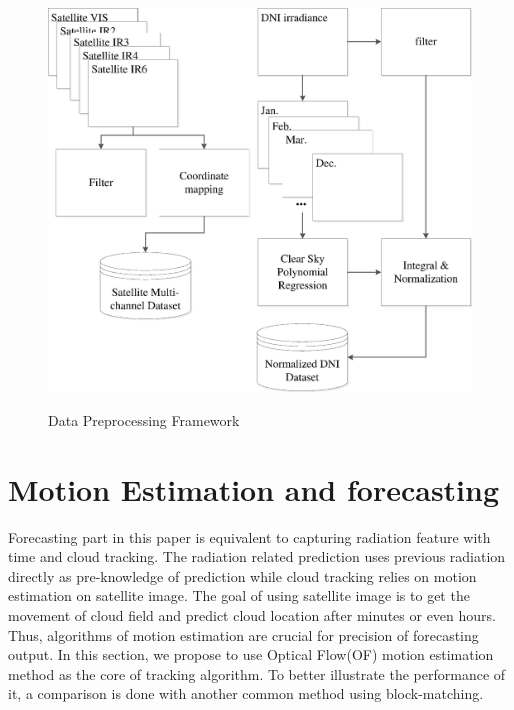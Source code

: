 \documentclass[conference]{IEEEtran}
\begin{document}
\begin{figure}[tb]
\centering
\includegraphics[width=3 in]{satprepro}
\label{fig:satpre}
\caption{Data Preprocessing Framework}
\end{figure}

\section{Motion Estimation and forecasting}
\label{sec:forecasting}
Forecasting part in this paper is equivalent to capturing radiation feature with
time and cloud tracking. The radiation related prediction uses previous
radiation directly as pre-knowledge of prediction while cloud tracking relies
on motion estimation on satellite image. The goal of using satellite image is to
get the movement of cloud field and predict cloud location after minutes
or even hours. Thus, algorithms of motion estimation are crucial for precision
of forecasting output. In this section, we propose to use Optical Flow(OF)
motion estimation method as the core of tracking algorithm. To better illustrate
the performance of it, a comparison is done with another common method using
block-matching.

\end{document}
